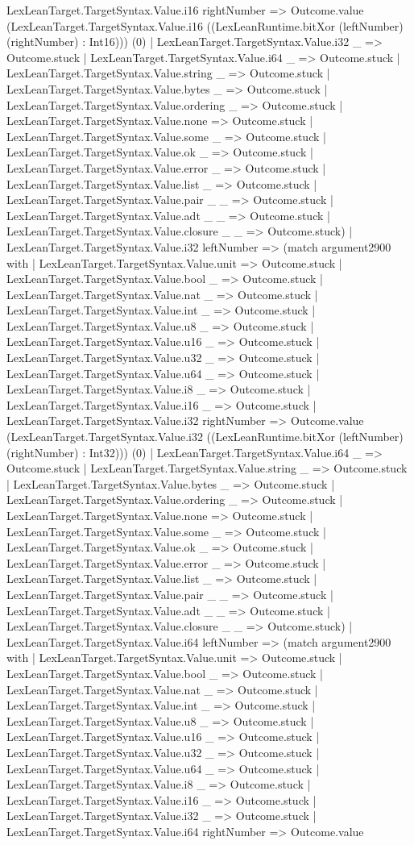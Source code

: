 \documentclass[11pt]{article}
\begin{document}
LexLeanTarget.TargetSyntax.Value.i16 rightNumber => Outcome.value (LexLeanTarget.TargetSyntax.Value.i16 ((LexLeanRuntime.bitXor (leftNumber) (rightNumber) : Int16))) (0) | LexLeanTarget.TargetSyntax.Value.i32 \_ => Outcome.stuck | LexLeanTarget.TargetSyntax.Value.i64 \_ => Outcome.stuck | LexLeanTarget.TargetSyntax.Value.string \_ => Outcome.stuck | LexLeanTarget.TargetSyntax.Value.bytes \_ => Outcome.stuck | LexLeanTarget.TargetSyntax.Value.ordering \_ => Outcome.stuck | LexLeanTarget.TargetSyntax.Value.none => Outcome.stuck | LexLeanTarget.TargetSyntax.Value.some \_ => Outcome.stuck | LexLeanTarget.TargetSyntax.Value.ok \_ => Outcome.stuck | LexLeanTarget.TargetSyntax.Value.error \_ => Outcome.stuck | LexLeanTarget.TargetSyntax.Value.list \_ => Outcome.stuck | LexLeanTarget.TargetSyntax.Value.pair \_ \_ => Outcome.stuck | LexLeanTarget.TargetSyntax.Value.adt \_ \_ => Outcome.stuck | LexLeanTarget.TargetSyntax.Value.closure \_ \_ => Outcome.stuck) | LexLeanTarget.TargetSyntax.Value.i32 leftNumber => (match argument2900 with | LexLeanTarget.TargetSyntax.Value.unit => Outcome.stuck | LexLeanTarget.TargetSyntax.Value.bool \_ => Outcome.stuck | LexLeanTarget.TargetSyntax.Value.nat \_ => Outcome.stuck | LexLeanTarget.TargetSyntax.Value.int \_ => Outcome.stuck | LexLeanTarget.TargetSyntax.Value.u8 \_ => Outcome.stuck | LexLeanTarget.TargetSyntax.Value.u16 \_ => Outcome.stuck | LexLeanTarget.TargetSyntax.Value.u32 \_ => Outcome.stuck | LexLeanTarget.TargetSyntax.Value.u64 \_ => Outcome.stuck | LexLeanTarget.TargetSyntax.Value.i8 \_ => Outcome.stuck | LexLeanTarget.TargetSyntax.Value.i16 \_ => Outcome.stuck | LexLeanTarget.TargetSyntax.Value.i32 rightNumber => Outcome.value (LexLeanTarget.TargetSyntax.Value.i32 ((LexLeanRuntime.bitXor (leftNumber) (rightNumber) : Int32))) (0) | LexLeanTarget.TargetSyntax.Value.i64 \_ => Outcome.stuck | LexLeanTarget.TargetSyntax.Value.string \_ => Outcome.stuck | LexLeanTarget.TargetSyntax.Value.bytes \_ => Outcome.stuck | LexLeanTarget.TargetSyntax.Value.ordering \_ => Outcome.stuck | LexLeanTarget.TargetSyntax.Value.none => Outcome.stuck | LexLeanTarget.TargetSyntax.Value.some \_ => Outcome.stuck | LexLeanTarget.TargetSyntax.Value.ok \_ => Outcome.stuck | LexLeanTarget.TargetSyntax.Value.error \_ => Outcome.stuck | LexLeanTarget.TargetSyntax.Value.list \_ => Outcome.stuck | LexLeanTarget.TargetSyntax.Value.pair \_ \_ => Outcome.stuck | LexLeanTarget.TargetSyntax.Value.adt \_ \_ => Outcome.stuck | LexLeanTarget.TargetSyntax.Value.closure \_ \_ => Outcome.stuck) | LexLeanTarget.TargetSyntax.Value.i64 leftNumber => (match argument2900 with | LexLeanTarget.TargetSyntax.Value.unit => Outcome.stuck | LexLeanTarget.TargetSyntax.Value.bool \_ => Outcome.stuck | LexLeanTarget.TargetSyntax.Value.nat \_ => Outcome.stuck | LexLeanTarget.TargetSyntax.Value.int \_ => Outcome.stuck | LexLeanTarget.TargetSyntax.Value.u8 \_ => Outcome.stuck | LexLeanTarget.TargetSyntax.Value.u16 \_ => Outcome.stuck | LexLeanTarget.TargetSyntax.Value.u32 \_ => Outcome.stuck | LexLeanTarget.TargetSyntax.Value.u64 \_ => Outcome.stuck | LexLeanTarget.TargetSyntax.Value.i8 \_ => Outcome.stuck | LexLeanTarget.TargetSyntax.Value.i16 \_ => Outcome.stuck | LexLeanTarget.TargetSyntax.Value.i32 \_ => Outcome.stuck | LexLeanTarget.TargetSyntax.Value.i64 rightNumber => Outcome.value 
\end{document}
